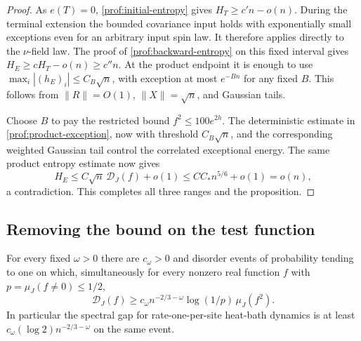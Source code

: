 \begin{proof}
As $e(T)=0$, \eqref{prof:initial-entropy} gives $H_T\ge c'n-o(n)$.
During the terminal extension the bounded covariance input holds with
exponentially small exceptions even for an arbitrary input spin law.
It therefore applies directly to the $\nu$-field law.  The proof of
\eqref{prof:backward-entropy} on this fixed interval gives
$H_E\ge cH_T-o(n)\ge c''n$.  At the product endpoint it is enough to use
$\max_i|(h_E)_i|\le C_B\sqrt n$, with exception at most $e^{-Bn}$ for any
fixed $B$.  This follows from $\|R\|=O(1)$, $\|X\|=\sqrt n$, and Gaussian
tails.

Choose \(B\) to pay the restricted bound \(f^2\le100e^{2h}\).
The deterministic estimate in \eqref{prof:product-exception},
now with threshold \(C_B\sqrt n\), and the corresponding weighted
Gaussian tail control the correlated exceptional energy. The same product entropy estimate now
gives
\[
 H_E\le C\sqrt n\,\mathcal D_J(f)+o(1)
      \le CC_*n^{5/6}+o(1)=o(n),
\]
a contradiction.  This completes all three ranges and the proposition.
\end{proof}

\subsection{Removing the bound on the test function}

\begin{theorem}
\label{prof:support-profile}
\label{prof:thm-profile}
For every fixed $\omega>0$ there are $c_\omega>0$ and disorder events of
probability tending to one on which, simultaneously for every nonzero real
function $f$ with $p=\mu_J(f\ne0)\le1/2$,
\begin{equation}
 \mathcal D_J(f)
   \ge c_\omega n^{-2/3-\omega}\log(1/p)\,\mu_J(f^2).
 \label{prof:full-profile}
\end{equation}
In particular the spectral gap for rate-one-per-site heat-bath dynamics is
at least $c_\omega(\log2)n^{-2/3-\omega}$ on the same event.
\end{theorem}

